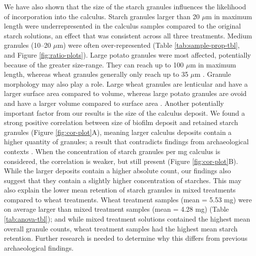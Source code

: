 \documentclass[utf8]{../templates/frontiersSCNS}
\begin{document}
We have also shown that the size of the starch granules influences the likelihood
of incorporation into the calculus. Starch granules larger than 20 \(\mu\)m in
maximum length were underrepresented in the calculus samples compared to the original
starch solutions, an effect that was consistent across all three treatments. Medium
granules (10--20 \(\mu\)m) were often over-represented
(Table \ref{tab:sample-prop-tbl},
and
Figure \ref{fig:ratio-plots}).
Large potato granules were most affected, potentially because of the greater
size-range. They can reach up to 100 \(\mu\)m in maximum length, whereas wheat
granules generally only reach up to 35 \(\mu\)m
\citep[174-176]{gismondiStarchGranules2019, haslamDecompositionStarch2004, seidemannStarchAtlas1966}.
Granule morphology may also play a role. Large wheat granules
are lenticular and have a larger surface area compared
to volume, whereas large potato granules are ovoid and have a larger volume
compared to surface area
\citetext{\citealp{vandeveldeStarchMorphology2002}; \citealp{janeAnthologyStarch1994}; \citealp[364-365]{reichertStarchBible1913b}; \citealp[174-176]{seidemannStarchAtlas1966}}.
Another potentially important factor
from our results is the size of the calculus deposit. We found a
strong positive correlation between size of biofilm deposit and
retained starch granules (Figure \ref{fig:cor-plot}A), meaning larger calculus
deposits contain a higher quantity of granules;
a result that contradicts findings from archaeological contexts
\citep{wesolowskiEvaluatingMicrofossil2010, dudgeonDietGeography2014}.
When the concentration of starch granules
per mg calculus is considered, the correlation is weaker, but still present
(Figure \ref{fig:cor-plot}B).
While the larger deposits contain a higher absolute count, our findings also suggest
that they contain a slightly higher concentration of starches. This may also explain
the lower mean retention of starch granules in mixed treatments compared to
wheat treatments. Wheat treatment samples (mean = 5.53 mg) were on average larger than mixed treatment samples (mean = 4.28 mg) (Table \ref{tab:anova-tbl}); and while mixed treatment solutions contained the highest mean overall
granule counts, wheat treatment samples had the highest mean starch retention.
Further research is needed to determine why this differs from previous archaeological
findings.
\end{document}
